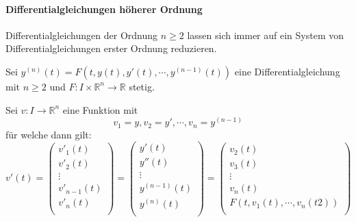 \paragraph{Differentialgleichungen höherer Ordnung}
	Differentialgleichungen der Ordnung $ n \geq 2 $ lassen sich immer auf ein System von Differentialgleichungen erster Ordnung reduzieren.

	Sei $ y ^ {(n)} (t) = F(t, y(t), y'(t), \cdots, y ^ {(n - 1)} (t)) $ eine Differentialgleichung mit $ n \geq 2 $ und $ F : I \times \mathbb{R} ^ n \rightarrow \mathbb{R} $ stetig.

	Sei $ v : I \rightarrow \mathbb{R} ^ n $ eine Funktion mit \[ v _ 1 = y, v _ 2 = y', \cdots, v _ n = y ^ {( n - 1 )} \] für welche dann gilt:
	\begin{equation*}
		v'(t) =
		\begin{pmatrix}
			v' _ 1 (t)         \\
			v' _ 2 (t)         \\
			\vdots             \\
			v' _ { n - 1 } (t) \\
			v' _ n (t)         \\
		\end{pmatrix}
		=
		\begin{pmatrix}
			y'(t)             \\
			y''(t)            \\
			\vdots            \\
			y ^ {(n - 1)} (t) \\
			y ^ {(n)} (t)     \\
		\end{pmatrix}
		=
		\begin{pmatrix}
			v _ 2 (t)                           \\
			v _ 3 (t)                           \\
			\vdots                              \\
			v _ n (t)                           \\
			F(t, v _ 1 (t), \cdots, v _ n (t2)) \\
		\end{pmatrix}
	\end{equation*}



